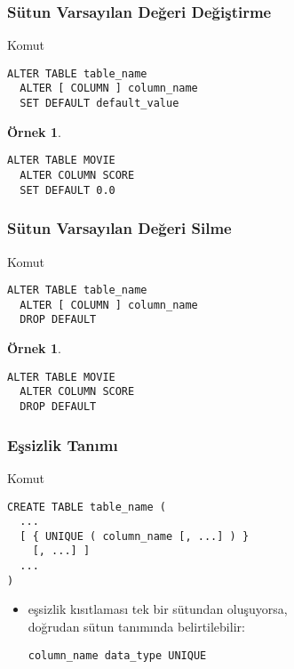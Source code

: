 \documentclass[dvipsnames]{beamer}
\theoremstyle{definition}
\theoremstyle{example}
\newtheorem{ornek}[theorem]{Örnek}
\theoremstyle{plain}
\begin{document}
\begin{frame}[fragile]
  \frametitle{Sütun Varsayılan Değeri Değiştirme}

  \begin{block}{Komut}
    \begin{lstlisting}
ALTER TABLE table_name
  ALTER [ COLUMN ] column_name
  SET DEFAULT default_value
    \end{lstlisting}
  \end{block}

  \pause
  \medskip
  \begin{ornek}
    \begin{lstlisting}
ALTER TABLE MOVIE
  ALTER COLUMN SCORE
  SET DEFAULT 0.0
    \end{lstlisting}
  \end{ornek}
\end{frame}

\begin{frame}[fragile]
  \frametitle{Sütun Varsayılan Değeri Silme}

  \begin{block}{Komut}
    \begin{lstlisting}
ALTER TABLE table_name
  ALTER [ COLUMN ] column_name
  DROP DEFAULT
    \end{lstlisting}
  \end{block}

  \pause
  \medskip
  \begin{ornek}
    \begin{lstlisting}
ALTER TABLE MOVIE
  ALTER COLUMN SCORE
  DROP DEFAULT
    \end{lstlisting}
  \end{ornek}
\end{frame}

\begin{frame}[fragile]
  \frametitle{Eşsizlik Tanımı}

  \begin{block}{Komut}
    \begin{lstlisting}
CREATE TABLE table_name (
  ...
  [ { UNIQUE ( column_name [, ...] ) }
    [, ...] ]
  ...
)
    \end{lstlisting}
  \end{block}

  \pause
  \begin{itemize}
    \item eşsizlik kısıtlaması tek bir sütundan oluşuyorsa,\\
      doğrudan sütun tanımında belirtilebilir:
      \begin{lstlisting}
column_name data_type UNIQUE
      \end{lstlisting}
  \end{itemize}
\end{frame}
\end{document}

